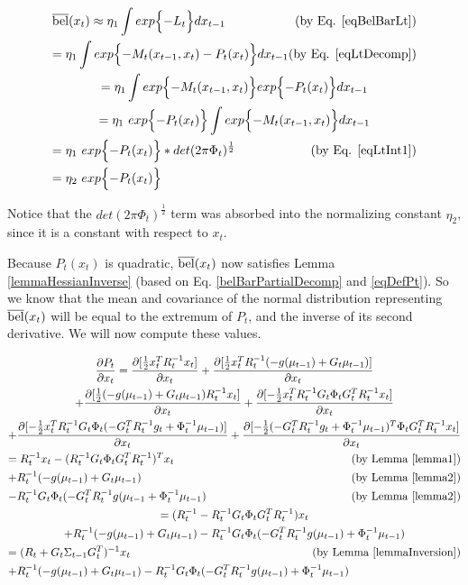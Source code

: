 \begin{multline} \label{belBarPartialDecomp}
\overline{\bel}(x_t) \approx \eta_1 \int exp\Bigl\{-L_t\Bigr\}dx_{t-1} \hfill \text{(by Eq. \ref{eqBelBarLt})} \\
= \eta_1 \int exp\Bigl\{-M_t(x_{t-1},x_t) - P_t(x_t)\Bigr\}dx_{t-1} \hfill \text{(by Eq. \ref{eqLtDecomp})} \\
= \eta_1 \int exp\Bigl\{-M_t(x_{t-1},x_t)\Bigr\} exp \Bigl\{ - P_t(x_t)\Bigr\}dx_{t-1} \\
= \eta_1\ exp \Bigl\{ - P_t(x_t)\Bigr\} \int exp\Bigl\{-M_t(x_{t-1},x_t)\Bigr\} dx_{t-1} \\
= \eta_1\ exp \Bigl\{ - P_t(x_t)\Bigr\} * det(2 \pi \Phi_t)^{\frac{1}{2}} \hfill \text{(by Eq. \ref{eqLtInt1})} \\
= \eta_2\ exp \Bigl\{ - P_t(x_t)\Bigr\} \hfill
\end{multline}

Notice that the \(det(2 \pi \Phi_t)^{\frac{1}{2}}\) term was absorbed into the normalizing constant \(\eta_2\), since it is a constant with respect to \(x_t\).

Because \(P_t(x_t)\) is quadratic, \(\overline{\mathrm{bel}}(x_t)\) now satisfies Lemma \ref{lemmaHessianInverse} (based on Eq. \ref{belBarPartialDecomp} and \ref{eqDefPt}). So we know that the mean and covariance of the normal distribution representing \(\overline{\mathrm{bel}}(x_t)\) will be equal to the extremum of \(P_t\), and the inverse of its second derivative. We will now compute these values.

\begin{multline*}
\frac{\partial P_t}{\partial x_t} = \frac{\partial [\frac{1}{2} x_t^T R_t^{-1}x_t]}{\partial x_t} + \frac{\partial [\frac{1}{2} x_t^TR_t^{-1}(-g(\mu_{t-1})+G_t\mu_{t-1})]}{\partial x_t} \\
+ \frac{\partial [\frac{1}{2} (-g(\mu_{t-1})+G_t\mu_{t-1})R_t^{-1}x_t]}{\partial x_t} + \frac{\partial [-\frac{1}{2} x_t^TR_t^{-1}G_t\Phi_tG_t^TR_t^{-1}x_t]}{\partial x_t} \\
+ \frac{\partial [-\frac{1}{2} x_t^TR_t^{-1}G_t\Phi_t(-G_t^TR_t^{-1}g_t + \Phi_t^{-1}\mu_{t-1})]}{\partial x_t} + \frac{\partial [-\frac{1}{2} (-G_t^TR_t^{-1}g_t + \Phi_t^{-1}\mu_{t-1})^T\Phi_tG_t^TR_t^{-1}x_t]}{\partial x_t} \\
= R_t^{-1}x_t - (R_t^{-1}G_t\Phi_tG_t^TR_t^{-1})^Tx_t  \hfill \text{(by Lemma \ref{lemma1})} \\
+ R_t^{-1}(-g(\mu_{t-1}) + G_t\mu_{t-1}) \hfill \text{(by Lemma \ref{lemma2})} \\
-R_t^{-1}G_t\Phi_t(-G_t^TR_t^{-1}g(\mu_{t-1} + \Phi_t^{-1}\mu_{t-1}) \hfill \text{(by Lemma \ref{lemma2})} \\
= (R_t^{-1} - R_t^{-1}G_t\Phi_tG_t^TR_t^{-1})x_t \\
+ R_t^{-1}(-g(\mu_{t-1}) + G_t\mu_{t-1}) - R_t^{-1}G_t\Phi_t(-G_t^TR_t^{-1}g(\mu_{t-1}) + \Phi_t^{-1}\mu_{t-1}) \\
= (R_t + G_t\Sigma_{t-1}G_t^T)^{-1}x_t \hfill \text{(by Lemma \ref{lemmaInversion})} \\
+ R_t^{-1}(-g(\mu_{t-1}) + G_t\mu_{t-1}) - R_t^{-1}G_t\Phi_t(-G_t^TR_t^{-1}g(\mu_{t-1}) + \Phi_t^{-1}\mu_{t-1}) \hfill
\end{multline*}

